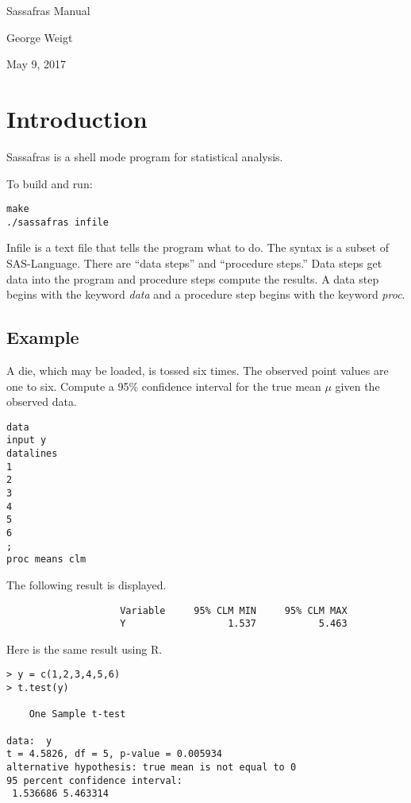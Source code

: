 \documentclass[11pt]{article}
\begin{document}
\begin{center}
{\LARGE Sassafras Manual}

George Weigt

May 9, 2017
\end{center}

\tableofcontents

\newpage

\section{Introduction}
Sassafras is a shell mode program for statistical analysis.

\noindent
To build and run:

\begin{Verbatim}
make
./sassafras infile
\end{Verbatim}

Infile is a text file that tells the program what to do.
The syntax is a subset of SAS-Language.
There are ``data steps'' and ``procedure steps.''
Data steps get data into the program and procedure steps
compute the results.
A data step begins with the keyword {\it data}
and a procedure step begins with the keyword {\it proc}.

\subsection*{Example}
A die, which may be loaded, is tossed six times.
The observed point values are one to six.
Compute a 95\% confidence interval for the true mean $\mu$
given the observed data.

\begin{Verbatim}
data
input y
datalines
1
2
3
4
5
6
;
proc means clm
\end{Verbatim}

The following result is displayed.

\begin{Verbatim}
                    Variable     95% CLM MIN     95% CLM MAX
                    Y                  1.537           5.463
\end{Verbatim}

Here is the same result using R.

\begin{Verbatim}
> y = c(1,2,3,4,5,6)
> t.test(y)

	One Sample t-test

data:  y
t = 4.5826, df = 5, p-value = 0.005934
alternative hypothesis: true mean is not equal to 0
95 percent confidence interval:
 1.536686 5.463314
\end{Verbatim}
\end{document}
